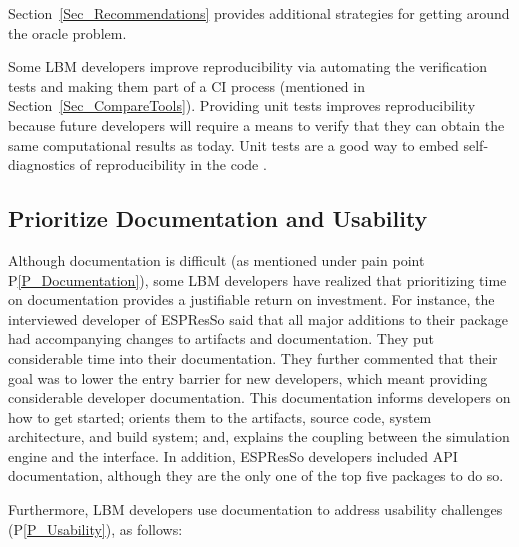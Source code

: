 \documentclass[final, 3p, times, authoryear]{elsarticle}
\newcommand{\ppref}[1]{P\ref{#1}}
\begin{document}
\noindent Section~\ref{Sec_Recommendations} provides additional strategies for
getting around the oracle problem.

Some LBM developers improve reproducibility via automating the verification
tests and making them part of a CI process (mentioned in
Section~\ref{Sec_CompareTools}).  Providing unit tests improves reproducibility
because future developers will require a means to verify that they can obtain
the same computational results as today.  Unit tests are a good way to embed
self-diagnostics of reproducibility in the code \citep{BenureauAndRougier2017}.

\subsection{Prioritize Documentation and Usability} \label{Sec_RecommendDoc}

Although documentation is difficult (as mentioned under pain point
\ppref{P_Documentation}), some LBM developers have realized that prioritizing
time on documentation provides a justifiable return on investment. For instance,
the interviewed developer of ESPResSo said that all major additions to their
package had accompanying changes to artifacts and documentation. They put
considerable time into their documentation. They further commented that their
goal was to lower the entry barrier for new developers, which meant providing
considerable developer documentation. This documentation informs developers on
how to get started; orients them to the artifacts, source code, system
architecture, and build system; and, explains the coupling between the
simulation engine and the interface. In addition, ESPResSo developers included
API documentation, although they are the only one of the top five packages to do
so.

Furthermore, LBM developers use documentation to address usability challenges
(\ppref{P_Usability}), as follows:
\end{document}
